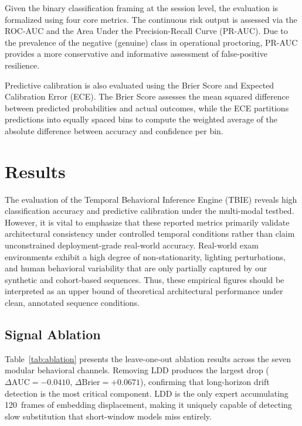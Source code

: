 \documentclass[journal]{IEEEtran}
\begin{document}
Given the binary classification framing at the session level, the evaluation is formalized using four core metrics. The continuous risk output is assessed via the ROC-AUC and the Area Under the Precision-Recall Curve (PR-AUC). Due to the prevalence of the negative (genuine) class in operational proctoring, PR-AUC provides a more conservative and informative assessment of false-positive resilience.

Predictive calibration is also evaluated using the Brier Score and Expected Calibration Error (ECE). The Brier Score assesses the mean squared difference between predicted probabilities and actual outcomes, while the ECE partitions predictions into equally spaced bins to compute the weighted average of the absolute difference between accuracy and confidence per bin.


\section{Results}
\label{sec:results}

The evaluation of the Temporal Behavioral Inference Engine (TBIE) reveals high classification accuracy and predictive calibration under the multi-modal testbed. However, it is vital to emphasize that these reported metrics primarily validate architectural consistency under controlled temporal conditions rather than claim unconstrained deployment-grade real-world accuracy. Real-world exam environments exhibit a high degree of non-stationarity, lighting perturbations, and human behavioral variability that are only partially captured by our synthetic and cohort-based sequences. Thus, these empirical figures should be interpreted as an upper bound of theoretical architectural performance under clean, annotated sequence conditions.

\subsection{Signal Ablation}

Table~\ref{tab:ablation} presents the leave-one-out ablation results across the seven modular behavioral channels. Removing LDD produces the largest drop ($\Delta\mathrm{AUC} = {-}0.0410$, $\Delta\mathrm{Brier} = {+}0.0671$), confirming that long-horizon drift detection is the most critical component. LDD is the only expert accumulating 120~frames of embedding displacement, making it uniquely capable of detecting slow substitution that short-window models miss entirely.
\end{document}
